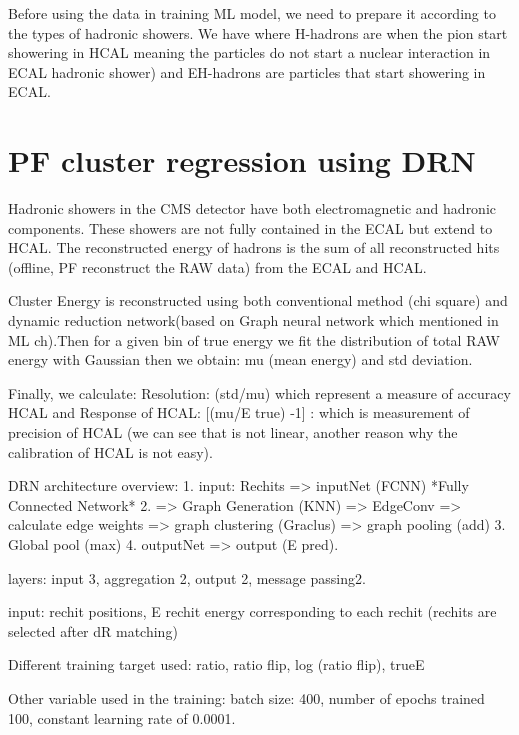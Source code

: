 Before using the data in training ML model, we need to prepare it according to the types of hadronic showers.
We have where H-hadrons are when the pion start showering in HCAL meaning the particles do not start a nuclear interaction in ECAL hadronic shower) and EH-hadrons are particles that start showering in ECAL. 


\section{PF cluster regression using DRN}

Hadronic showers in the CMS detector have both electromagnetic and hadronic components. These showers are not fully contained in the ECAL but extend to HCAL. The reconstructed energy of hadrons is the sum of all reconstructed hits (offline, PF reconstruct the RAW data) from the ECAL and HCAL. 


Cluster Energy is reconstructed using both conventional method (chi square) and dynamic reduction network(based on Graph neural network which mentioned in ML ch).Then for a given bin of true energy we fit the distribution of total RAW energy with Gaussian then we obtain: mu (mean energy) and std deviation.

Finally, we calculate: Resolution: (std/mu) which represent a measure of accuracy HCAL 
and Response of HCAL:  [(mu/E true) -1] : which is measurement of precision of HCAL 
(we can see that is not linear, another reason why the calibration of HCAL is not easy).

DRN architecture overview:
1. input: Rechits => inputNet (FCNN) *Fully Connected Network*
2. => Graph Generation (KNN) => EdgeConv => calculate edge weights => graph clustering (Graclus) => graph pooling (add)
3. Global pool (max) 4. outputNet => output (E pred).

layers: input 3, aggregation 2, output 2, message passing2.

input: rechit positions, E rechit energy corresponding to each rechit (rechits are selected after dR matching)

Different training target used: ratio, ratio flip, log (ratio flip), trueE

Other variable used in the training: batch size: 400, number of epochs trained 100, constant learning rate of 0.0001.

